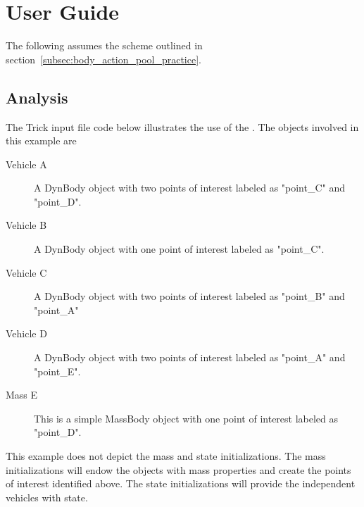 %

\chapter{User Guide}\label{ch:\modelpartid:user}
The following assumes the scheme outlined in
section~\ref{subsec:body_action_pool_practice}.

\section{Analysis}

The Trick input file code below illustrates the use of the \partxname.
The objects involved in this example are
\begin{description}
\item[Vehicle A] A DynBody object with two points of interest
  labeled as "point\_C" and "point\_D".
\item[Vehicle B] A DynBody object with one point of interest
  labeled as "point\_C".
\item[Vehicle C] A DynBody object with two points of interest
  labeled as "point\_B" and "point\_A"
\item[Vehicle D] A DynBody object with two points of interest
  labeled as "point\_A" and "point\_E".
\item[Mass E] This is a simple MassBody object with one point of interest
  labeled as "point\_D".
\end{description}
This example does not depict the mass and state initializations.
The mass initializations will endow the objects with mass properties
and create the points of interest identified above.
The state initializations will provide the independent vehicles
with state.

